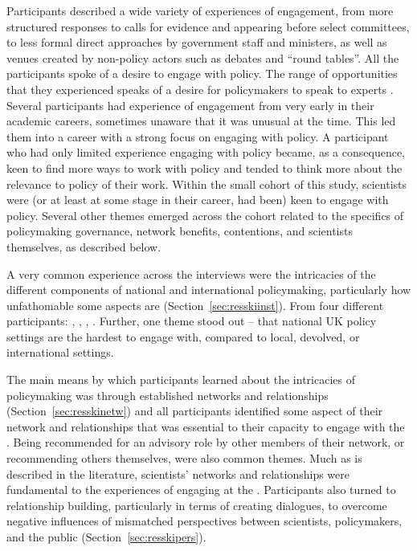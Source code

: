 Participants described a wide variety of experiences of engagement, from more structured responses to calls for evidence and appearing before select committees, to less formal direct approaches by government staff and ministers, as well as venues created by non-policy actors such as debates and ``round tables''. All the participants spoke of a desire to engage with policy. 
The range of opportunities that they experienced speaks of a desire for policymakers to speak to experts%
. Several participants had experience of \SPI{} engagement from very early in their academic careers, sometimes unaware that it was unusual at the time. This led them into a career with a strong focus on engaging with policy. A participant who had only limited experience engaging with policy became, as a consequence, keen to find more ways to work with policy and tended to think more about the relevance to policy of their work. Within the small cohort of this study, scientists were (or at least at some stage in their career, had been) keen to engage with policy. Several other themes emerged across the cohort related to the specifics of policymaking governance, network benefits, \CAN{} contentions, and scientists themselves, as described below. 

A very common experience across the interviews were the intricacies of the different components of national and international policymaking, particularly how unfathomable some aspects are (Section~\ref{sec:resskiinst}). From four different participants: , , , . Further, one theme stood out -- that national UK policy settings are the hardest to engage with, compared to local, devolved, or international settings.

The main means by which participants learned about the intricacies of policymaking was through established networks and relationships (Section~\ref{sec:resskinetw}) and all participants identified some aspect of their network and relationships that was essential to their capacity to engage with the \SPI. Being recommended for an advisory role by other members of their network, or recommending others themselves, were also common themes. Much as is described in the literature, scientists' networks and relationships were fundamental to the experiences of engaging at the \SPI. Participants also turned to relationship building, particularly in terms of creating dialogues, to overcome negative influences of mismatched perspectives between scientists, policymakers, and the public  (Section~\ref{sec:resskipers}).

